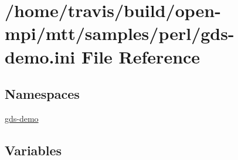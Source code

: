 \hypertarget{gds-demo_8ini}{\section{/home/travis/build/open-\/mpi/mtt/samples/perl/gds-\/demo.ini File Reference}
\label{gds-demo_8ini}
}
\subsection*{Namespaces}
\begin{DoxyCompactItemize}
\item 
\hyperlink{namespacegds-demo}{gds-\/demo}
\end{DoxyCompactItemize}
\subsection*{Variables}
